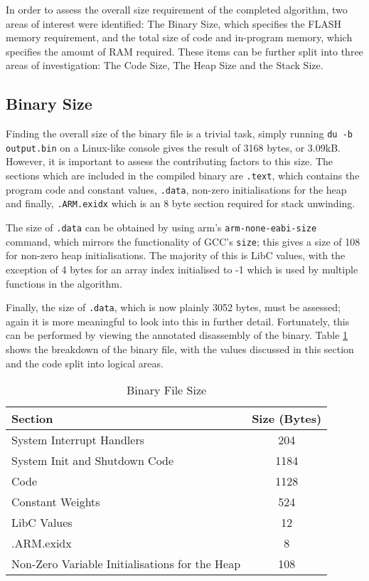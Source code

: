 
In order to assess the overall size requirement of the completed algorithm, two areas of interest were identified: The Binary Size, which specifies the FLASH memory requirement, and the total size of code and in-program memory, which specifies the amount of RAM required. These items can be further split into three areas of investigation: The Code Size, The Heap Size and the Stack Size.

\subsection{Binary Size}

Finding the overall size of the binary file is a trivial task, simply running \verb|du -b output.bin| on a Linux-like console gives the result of 3168 bytes, or 3.09kB. However, it is important to assess the contributing factors to this size. The sections which are included in the compiled binary are \verb|.text|, which contains the program code and constant values, \verb|.data|, non-zero initialisations for the heap and finally, \verb|.ARM.exidx| which is an 8 byte section required for stack unwinding.

The size of \verb|.data| can be obtained by using arm's \verb|arm-none-eabi-size| command, which mirrors the functionality of GCC's \verb|size|; this gives a size of 108 for non-zero heap initialisations. The majority of this is LibC values, with the exception of 4 bytes for an array index initialised to -1 which is used by multiple functions in the algorithm.

Finally, the size of \verb|.data|, which is now plainly 3052 bytes, must be assessed; again it is more meaningful to look into this in further detail. Fortunately, this can be performed by viewing the annotated disassembly of the binary. Table \ref{tab:prog-size} shows the breakdown of the binary file, with the values discussed in this section and the code split into logical areas.

\begin{table}[h]
    \centering
    \begin{tabular}{|l|c|}
        \hline
        Section & Size (Bytes) \\
        \hline
        System Interrupt Handlers & 204 \\
        System Init and Shutdown Code & 1184 \\
        Code & 1128 \\
        Constant Weights & 524 \\
        LibC Values & 12 \\
        .ARM.exidx & 8 \\
        Non-Zero Variable Initialisations for the Heap & 108 \\
        \hline
    \end{tabular}
    \caption{Binary File Size \label{tab:prog-size}}
\end{table}

